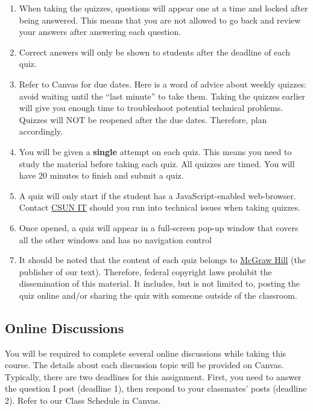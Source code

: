 \documentclass[11pt,]{article}
\begin{document}
\begin{enumerate}
\def\labelenumi{\arabic{enumi}.}
\item
  When taking the quizzes, questions will appear one at a time and
  locked after being answered. This means that you are not allowed to go
  back and review your answers after answering each question.
\item
  Correct answers will only be shown to students after the deadline of
  each quiz.
\item
  Refer to Canvas for due dates. Here is a word of advice about weekly
  quizzes: avoid waiting until the ``last minute'' to take them. Taking
  the quizzes earlier will give you enough time to troubleshoot
  potential technical problems. Quizzes will NOT be reopened after the
  due dates. Therefore, plan accordingly.
\item
  You will be given a \textbf{single} attempt on each quiz. This means
  you need to study the material before taking each quiz. All quizzes
  are timed. You will have 20 minutes to finish and submit a quiz.
\item
  A quiz will only start if the student has a JavaScript-enabled
  web-browser. Contact \href{https://www.csun.edu/it}{CSUN IT} should
  you run into technical issues when taking quizzes.
\item
  Once opened, a quiz will appear in a full-screen pop-up window that
  covers all the other windows and has no navigation control
\item
  It should be noted that the content of each quiz belongs to
  \href{https://www.mheducation.com/}{McGraw Hill} (the publisher of our
  text). Therefore, federal copyright laws prohibit the dissemination of
  this material. It includes, but is not limited to, posting the quiz
  online and/or sharing the quiz with someone outside of the classroom.
\end{enumerate}

\hypertarget{online-discussions}{%
\subsection{Online Discussions}\label{online-discussions}}

You will be required to complete several online discussions while taking
this course. The details about each discussion topic will be provided on
Canvas. Typically, there are two deadlines for this assignment. First,
you need to answer the question I post (deadline 1), then respond to
your classmates' posts (deadline 2). Refer to our Class Schedule in
Canvas.
\end{document}

